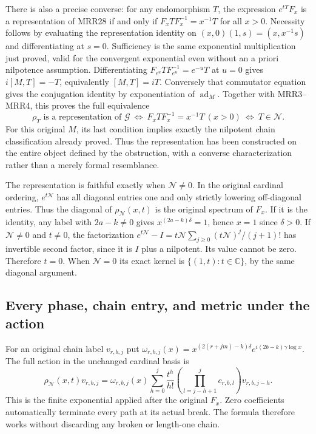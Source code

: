 There is also a precise converse: for any endomorphism $T$,
the expression $e^{tT}F_x$ is a representation of MRR28
if and only if $F_xTF_x^{-1}=x^{-1}T$ for all $x>0$.
Necessity follows by evaluating the representation identity
on $(x,0)(1,s)=(x,x^{-1}s)$ and differentiating at $s=0$.
Sufficiency is the same exponential multiplication just
proved, valid for the convergent exponential even without
an a priori nilpotence assumption. Differentiating
$F_{e^u}TF_{e^u}^{-1}=e^{-u}T$ at $u=0$ gives
$i[M,T]=-T$, equivalently $[M,T]=iT$.
Conversely that commutator equation gives the conjugation
identity by exponentiation of $\operatorname{ad}_M$.
Together with MRR3--MRR4, this proves the full equivalence
\[
\boxed{
\rho_T\text{ is a representation of }\mathcal G
\ \Longleftrightarrow\
F_xTF_x^{-1}=x^{-1}T\ (x>0)
\ \Longleftrightarrow\ T\in\mathscr N.}
\tag{MRR30}
\]
For this original $M$, its last condition implies exactly
the nilpotent chain classification already proved.
Thus the representation has been constructed on the entire
object defined by the obstruction, with a converse
characterization rather than a merely formal resemblance.

The representation is faithful exactly when $\mathcal N\ne0$.
In the original cardinal ordering, $e^{t\mathcal N}$ has
all diagonal entries one and only strictly lowering
off-diagonal entries. Thus the diagonal of
$\rho_{\mathcal N}(x,t)$ is the original spectrum of $F_x$.
If it is the identity, any label with $2a-k\ne0$ gives
$x^{(2a-k)\delta}=1$, hence $x=1$ since $\delta>0$.
If $\mathcal N\ne0$ and $t\ne0$, the factorization
$e^{t\mathcal N}-I=t\mathcal N
\sum_{j\ge0}(t\mathcal N)^j/(j+1)!$
has invertible second factor, since it is $I$ plus a
nilpotent. Its value cannot be zero. Therefore $t=0$.
When $\mathcal N=0$ its exact kernel is
$\{(1,t):t\in\mathbb C\}$, by the same diagonal argument.

\subsection{Every phase, chain entry, and metric under the action}

For an original chain label $v_{r,b,j}$ put
$\omega_{r,b,j}(x)=
x^{(2(r+jm)-k)\delta}e^{i(2b-k)\gamma\log x}$.
The full action in the unchanged cardinal basis is
\[
\rho_{\mathcal N}(x,t)v_{r,b,j}
=\omega_{r,b,j}(x)
\sum_{h=0}^j\frac{t^h}{h!}
 \left(\prod_{l=j-h+1}^jc_{r,b,l}\right)v_{r,b,j-h}.
\tag{MRR31}
\]
This is the finite exponential applied after the original
$F_x$. Zero coefficients automatically terminate every
path at its actual break. The formula therefore works
without discarding any broken or length-one chain.

